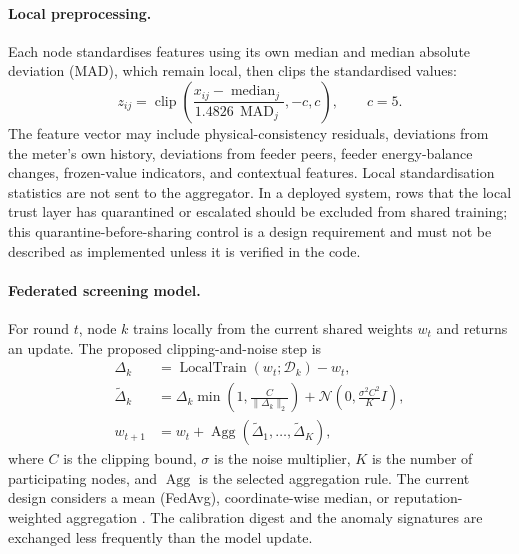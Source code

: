 \paragraph{Local preprocessing.} Each node standardises features using its own median and median absolute deviation (MAD), which remain local, then clips the standardised values:
\begin{equation}
 z_{ij}=\operatorname{clip}\!\left(
 \frac{x_{ij}-\operatorname{median}_j}{1.4826\,\operatorname{MAD}_j},-c,c\right),
 \qquad c=5.
 \label{eq:goal4-clipping}
\end{equation}
The feature vector may include physical-consistency residuals, deviations from the meter's own history, deviations from feeder peers, feeder energy-balance changes, frozen-value indicators, and contextual features. Local standardisation statistics are not sent to the aggregator. In a deployed system, rows that the local trust layer has quarantined or escalated should be excluded from shared training; this quarantine-before-sharing control is a design requirement and must not be described as implemented unless it is verified in the code.

\paragraph{Federated screening model.} For round $t$, node $k$ trains locally from the current shared weights $w_t$ and returns an update. The proposed clipping-and-noise step is
\begin{align}
 \Delta_k &= \operatorname{LocalTrain}(w_t;\mathcal{D}_k)-w_t, \\
 \widetilde{\Delta}_k &= \Delta_k\min\!\left(1,\frac{C}{\lVert\Delta_k\rVert_2}\right)
 + \mathcal{N}\!\left(0,\frac{\sigma^2 C^2}{K}I\right), \\
 w_{t+1} &= w_t+\operatorname{Agg}(\widetilde{\Delta}_1,\ldots,\widetilde{\Delta}_K),
 \label{eq:goal4-fed-update}
\end{align}
where $C$ is the clipping bound, $\sigma$ is the noise multiplier, $K$ is the number of participating nodes, and $\operatorname{Agg}$ is the selected aggregation rule. The current design considers a mean (FedAvg), coordinate-wise median, or reputation-weighted aggregation \cite{mcmahan2017,yin2018}. The calibration digest and the anomaly signatures are exchanged less frequently than the model update.

